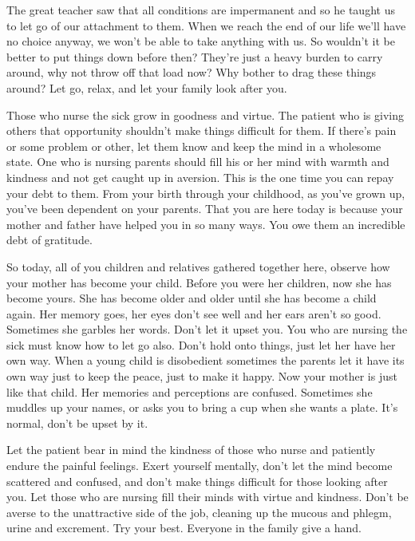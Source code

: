 The great teacher saw that all conditions are impermanent and so he taught us to let go of our attachment to them. When we reach the end of our life we'll have no choice anyway, we won't be able to take anything with us. So wouldn't it be better to put things down before then? They're just a heavy burden to carry around, why not throw off that load now? Why bother to drag these things around? Let go, relax, and let your family look after you.

Those who nurse the sick grow in goodness and virtue. The patient who is giving others that opportunity shouldn't make things difficult for them. If there's pain or some problem or other, let them know and keep the mind in a wholesome state. One who is nursing parents should fill his or her mind with warmth and kindness and not get caught up in aversion. This is the one time you can repay your debt to them. From your birth through your childhood, as you've grown up, you've been dependent on your parents. That you are here today is because your mother and father have helped you in so many ways. You owe them an incredible debt of gratitude.

So today, all of you children and relatives gathered together here, observe how your mother has become your child. Before you were her children, now she has become yours. She has become older and older until she has become a child again. Her memory goes, her eyes don't see well and her ears aren't so good. Sometimes she garbles her words. Don't let it upset you. You who are nursing the sick must know how to let go also. Don't hold onto things, just let her have her own way. When a young child is disobedient sometimes the parents let it have its own way just to keep the peace, just to make it happy. Now your mother is just like that child. Her memories and perceptions are confused. Sometimes she muddles up your names, or asks you to bring a cup when she wants a plate. It's normal, don't be upset by it.

Let the patient bear in mind the kindness of those who nurse and patiently endure the painful feelings. Exert yourself mentally, don't let the mind become scattered and confused, and don't make things difficult for those looking after you. Let those who are nursing fill their minds with virtue and kindness. Don't be averse to the unattractive side of the job, cleaning up the mucous and phlegm, urine and excrement. Try your best. Everyone in the family give a hand.

